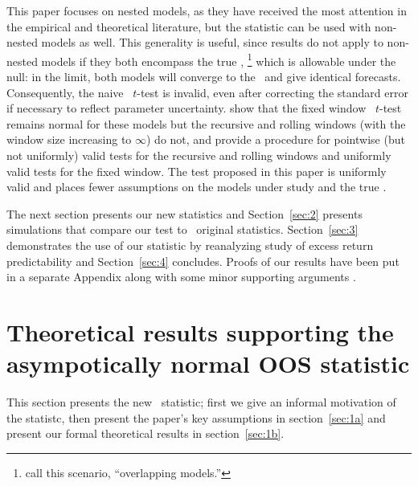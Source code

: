 \documentclass[12pt,fleqn]{article}
\begin{document}
This paper focuses on nested models, as they have received the most
attention in the empirical and theoretical literature, but the
statistic can be used with non-nested models as well.  This generality
is useful, since  results do not apply to non-nested
models if they both encompass the true \dgp,%
\footnote{\citet{ClM:11b}
  call this scenario, ``overlapping models.''} %
which is allowable
under the null: in the limit, both models will converge to the \dgp\
and give identical forecasts.  Consequently, the naive \oos\ $t$-test
is invalid, even after correcting the standard error if necessary to
reflect parameter uncertainty.  \citet{ClM:11b} show that the fixed
window \oos\ $t$-test remains normal for these models but the
recursive and rolling windows (with the window size increasing to
$\infty$) do not, and provide a procedure for pointwise (but not
uniformly) valid tests for the recursive and rolling windows and
uniformly valid tests for the fixed window.  The test proposed in this
paper is uniformly valid and places fewer assumptions on the models
under study and the true \dgp.

The next section presents our new statistics and Section~\ref{sec:2} presents
simulations that compare our test to \poscw\ original
statistics.  Section~\ref{sec:3} demonstrates the use of our statistic
by reanalyzing \citepos{GoW:08} study of excess return
predictability and Section~\ref{sec:4} concludes. Proofs of
our results have been put in a separate Appendix along with
some minor supporting arguments \citep{Cal:14}.

\section{Theoretical results supporting the asympotically normal OOS statistic}
\label{sec:1}

This section presents the new \oos\ statistic; first we give an
informal motivation of the statistc, then present the paper's key
assumptions in section~\ref{sec:1a} and present our formal theoretical
results in section~\ref{sec:1b}.
\end{document}
